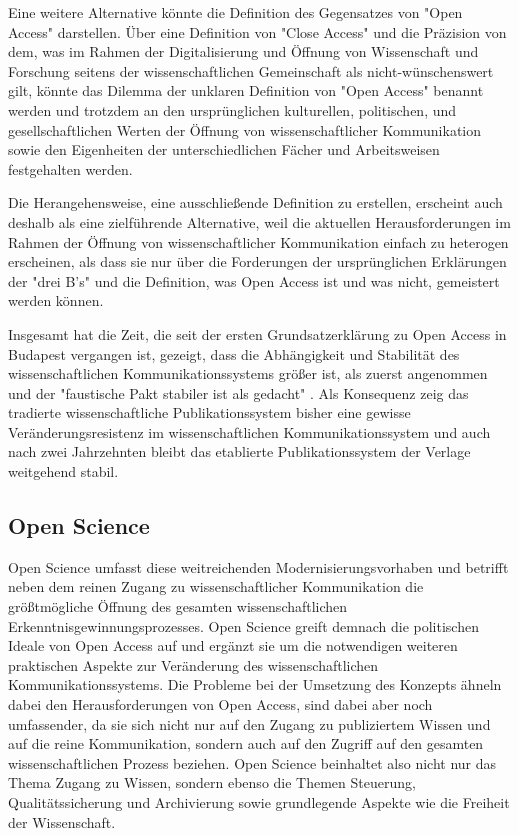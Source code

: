 Eine weitere Alternative könnte die Definition des Gegensatzes von "Open Access" darstellen. Über eine Definition von "Close Access" und die Präzision von dem, was im Rahmen der Digitalisierung und Öffnung von Wissenschaft und Forschung seitens der wissenschaftlichen Gemeinschaft als nicht-wünschenswert gilt, könnte das Dilemma der unklaren Definition von "Open Access" benannt werden und trotzdem an den ursprünglichen kulturellen, politischen, und gesellschaftlichen Werten der Öffnung von wissenschaftlicher Kommunikation sowie den Eigenheiten der unterschiedlichen Fächer und Arbeitsweisen festgehalten werden.

Die Herangehensweise, eine ausschließende Definition zu erstellen, erscheint auch deshalb als eine zielführende Alternative, weil die aktuellen Herausforderungen im Rahmen der Öffnung von wissenschaftlicher Kommunikation einfach zu heterogen erscheinen, als dass sie nur über die Forderungen der ursprünglichen Erklärungen der "drei B's" und die Definition, was Open Access ist und was nicht, gemeistert werden können.

Insgesamt hat die Zeit, die seit der ersten Grundsatzerklärung zu Open Access in Budapest vergangen ist, gezeigt, dass die Abhängigkeit und Stabilität des wissenschaftlichen Kommunikationssystems größer ist, als zuerst angenommen und der "faustische Pakt stabiler ist als gedacht" \cite{hagner_2015_sache_buches}. Als Konsequenz zeig das tradierte wissenschaftliche Publikationssystem bisher eine gewisse Veränderungsresistenz im wissenschaftlichen Kommunikationssystem und auch nach zwei Jahrzehnten bleibt das etablierte Publikationssystem der Verlage weitgehend stabil\cite{Hanekop_2014}.

\subsection{Open Science}

Open Science umfasst diese weitreichenden Modernisierungsvorhaben und betrifft neben dem reinen Zugang zu wissenschaftlicher Kommunikation die größtmögliche Öffnung des gesamten wissenschaftlichen Erkenntnisgewinnungsprozesses. Open Science greift demnach die politischen Ideale von Open Access auf und ergänzt sie um die notwendigen weiteren praktischen Aspekte zur Veränderung des wissenschaftlichen Kommunikationssystems. Die Probleme bei der Umsetzung des Konzepts ähneln dabei den Herausforderungen von Open Access, sind dabei aber noch umfassender, da sie sich nicht nur auf den Zugang zu publiziertem Wissen und auf die reine Kommunikation, sondern auch auf den Zugriff auf den gesamten wissenschaftlichen Prozess beziehen. Open Science beinhaltet also nicht nur das Thema Zugang zu Wissen, sondern ebenso die Themen Steuerung, Qualitätssicherung und Archivierung sowie grundlegende Aspekte wie die Freiheit der Wissenschaft.

